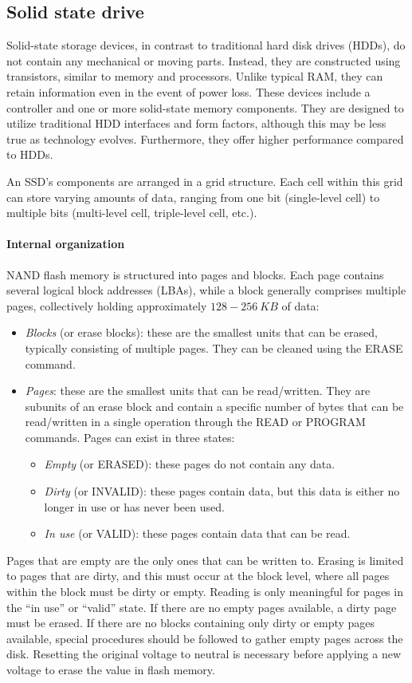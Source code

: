 \subsection{Solid state drive}
Solid-state storage devices, in contrast to traditional hard disk drives (HDDs), do not contain any mechanical or moving parts. 
Instead, they are constructed using transistors, similar to memory and processors. 
Unlike typical RAM, they can retain information even in the event of power loss.
These devices include a controller and one or more solid-state memory components. 
They are designed to utilize traditional HDD interfaces and form factors, although this may be less true as technology evolves. 
Furthermore, they offer higher performance compared to HDDs.

An SSD's components are arranged in a grid structure. 
Each cell within this grid can store varying amounts of data, ranging from one bit (single-level cell) to multiple bits (multi-level cell, triple-level cell, etc.).

\paragraph*{Internal organization}
NAND flash memory is structured into pages and blocks. 
Each page contains several logical block addresses (LBAs), while a block generally comprises multiple pages, collectively holding approximately $128-256\:KB$ of data: 
\begin{itemize}
    \item \textit{Blocks} (or erase blocks): these are the smallest units that can be erased, typically consisting of multiple pages. 
        They can be cleaned using the ERASE command.
    \item \textit{Pages}: these are the smallest units that can be read/written. 
        They are subunits of an erase block and contain a specific number of bytes that can be read/written in a single operation through the READ or PROGRAM commands. 
        Pages can exist in three states:
        \begin{itemize}
            \item \textit{Empty} (or ERASED): these pages do not contain any data.
            \item \textit{Dirty} (or INVALID): these pages contain data, but this data is either no longer in use or has never been used.
            \item \textit{In use} (or VALID): these pages contain data that can be read.
        \end{itemize}
\end{itemize}
Pages that are empty are the only ones that can be written to. 
Erasing is limited to pages that are dirty, and this must occur at the block level, where all pages within the block must be dirty or empty. 
Reading is only meaningful for pages in the ``in use'' or ``valid'' state. If there are no empty pages available, a dirty page must be erased. 
If there are no blocks containing only dirty or empty pages available, special procedures should be followed to gather empty pages across the disk.
Resetting the original voltage to neutral is necessary before applying a new voltage to erase the value in flash memory. 

